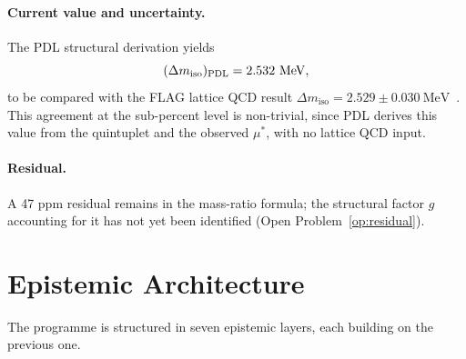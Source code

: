 \documentclass[11pt,a4paper]{article}
\theoremstyle{plain}
\theoremstyle{definition}
\theoremstyle{remark}
\newcommand{\PDL}{\textnormal{PDL}}
\newcommand{\mustar}{\mu^*}
\begin{document}
\paragraph{Current value and uncertainty.}
The PDL structural derivation yields
\[
(\Delta m_{\mathrm{iso}})_{\PDL} = 2.532~\mathrm{MeV},
\]
to be compared with the FLAG lattice QCD result $\Delta m_{\mathrm{iso}} = 2.529\pm 0.030~\mathrm{MeV}$~\citep{D30}.
This agreement at the sub-percent level is non-trivial, since PDL derives this value from the quintuplet and the observed $\mustar$, with no lattice QCD input.

\paragraph{Residual.}
A 47 ppm residual remains in the mass-ratio formula; the structural factor $g$ accounting for it has not yet been identified (Open Problem~\ref{op:residual}).

\section{Epistemic Architecture}
\label{sec:epistemic}

The programme is structured in seven epistemic layers, each building on the previous one.
\end{document}
